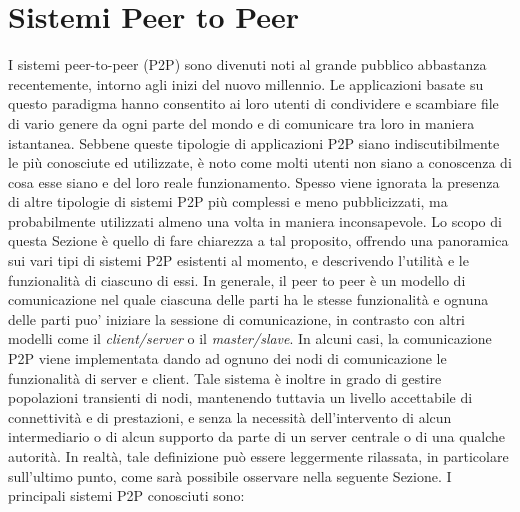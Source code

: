 \section{Sistemi Peer to Peer}
I sistemi peer-to-peer (P2P) sono divenuti noti al grande pubblico abbastanza recentemente, intorno agli inizi del nuovo millennio. Le applicazioni basate su questo paradigma hanno consentito ai loro utenti di condividere e scambiare file di vario genere da ogni parte del mondo e di comunicare tra loro in maniera istantanea.
Sebbene queste tipologie di applicazioni P2P siano indiscutibilmente le più conosciute ed utilizzate, è noto come molti utenti non siano a conoscenza di cosa esse siano e del loro reale funzionamento. Spesso viene ignorata la presenza di altre tipologie di sistemi P2P più complessi e meno pubblicizzati, ma probabilmente utilizzati almeno una volta in maniera inconsapevole. Lo scopo di questa Sezione è quello di fare chiarezza a tal proposito, offrendo una panoramica sui vari tipi di sistemi P2P esistenti al momento, e descrivendo l’utilità e le funzionalità di ciascuno di essi. In generale, il peer to peer è un modello di comunicazione nel quale ciascuna delle parti ha le stesse funzionalità e ognuna delle parti puo' iniziare la sessione di comunicazione, in contrasto con altri modelli come il \textit{client/server} o il \textit{master/slave}. In alcuni casi, la comunicazione P2P viene implementata dando ad ognuno dei nodi di comunicazione le funzionalità di server e client. Tale sistema è inoltre in grado di gestire popolazioni transienti di nodi, mantenendo tuttavia un livello accettabile di connettività e di prestazioni, e senza la necessità dell’intervento di alcun intermediario o di alcun supporto da parte di un server centrale o di una qualche autorità. In realtà, tale definizione può essere leggermente rilassata, in particolare sull’ultimo punto, come sarà possibile osservare nella seguente Sezione.
I principali sistemi P2P conosciuti sono:
